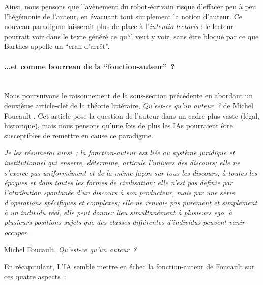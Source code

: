 \documentclass{article}
\newcommand{\subsubsubsection}[1]{\paragraph{#1}\mbox{}\\}
\newenvironment{citationbox}
{\begin{center}
		\begin{minipage}{.8\textwidth}
		}
		{
		\end{minipage}	
\end{center}
}
\begin{document}
					Ainsi, nous pensons que l'avènement du robot-écrivain risque d'effacer peu à peu l'hégémonie de l'auteur, en évacuant tout simplement la notion d'auteur. Ce nouveau paradigme laisserait plus de place à l'\textit{intentio lectoris} : le lecteur pourrait voir dans le texte généré ce qu'il veut y voir, sans être bloqué par ce que Barthes appelle un ``cran d'arrêt''.
				\subsubsubsection{...et comme bourreau de la ``fonction-auteur''~?}
					Nous poursuivons le raisonnement de la sous-section précédente en abordant un deuxième article-clef de la théorie littéraire, \textit{Qu'est-ce qu'un auteur~?} de Michel Foucault \cite{foucault1969}. Cet article pose la question de l'auteur dans un cadre plus vaste (légal, historique), mais nous pensons qu'une fois de plus les IAs pourraient être susceptibles de remettre en cause ce paradigme.
					\begin{citationbox}
						\textit{Je les résumerai ainsi~: la fonction-auteur est liée
						au système juridique et institutionnel qui enserre, détermine, articule l'univers des discours; elle ne
						s'exerce pas uniformément et de la même façon sur tous les discours, à toutes les époques et dans
						toutes les formes de civilisation; elle n'est pas définie par l'attribution spontanée d'un discours à
						son producteur, mais par une série d'opérations spécifiques et complexes; elle ne renvoie pas purement et simplement à un individu réel, elle peut donner lieu simultanément à plusieurs ego, à
						plusieurs positions-sujets que des classes différentes d'individus peuvent venir occuper.}
					\begin{flushright}
						Michel Foucault, \textit{Qu'est-ce qu'un auteur~?} \cite{foucault1969}
					\end{flushright}
					\end{citationbox}
					En récapitulant, L'IA semble mettre en échec la fonction-auteur de Foucault sur ces quatre aspects~:
					\vspace{2mm}
\end{document}

